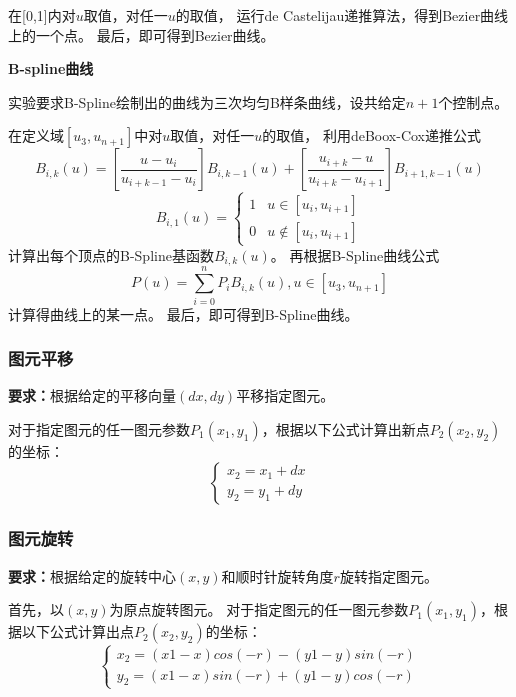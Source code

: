 \documentclass[a4paper,UTF8]{article}
\begin{document}
在[0,1]内对$u$取值，对任一$u$的取值，
运行de Castelijau递推算法，得到Bezier曲线上的一个点。
最后，即可得到Bezier曲线。

\textbf{B-spline曲线}

实验要求B-Spline绘制出的曲线为三次均匀B样条曲线，设共给定$n+1$个控制点。

在定义域$[u_3,u_{n+1}]$中对$u$取值，对任一$u$的取值，
利用deBoox-Cox递推公式
\begin{equation*}
    B_{i,k}(u)
    =[\frac{u-u_i}{u_{i+k-1}-u_i}]B_{i,k-1}(u)
    +[\frac{u_{i+k}-u}{u_{i+k}-u_{i+1}}]B_{i+1,k-1}(u)
\end{equation*}
\begin{equation*}
    B_{i,1}(u)=
    \begin{cases}
    1 & u\in[u_i,u_{i+1}]\\
    0 & u\not\in[u_i,u_{i+1}]
    \end{cases}
\end{equation*}
计算出每个顶点的B-Spline基函数$B_{i,k}(u)$。
再根据B-Spline曲线公式
\begin{equation*}
    P(u)=\sum_{i=0}^nP_iB_{i,k}(u),u\in[u_3,u_{n+1}]
\end{equation*}
计算得曲线上的某一点。
最后，即可得到B-Spline曲线。


\subsubsection{图元平移}
\textbf{要求：}根据给定的平移向量$(dx,dy)$平移指定图元。

对于指定图元的任一图元参数$P_1(x_1,y_1)$，根据以下公式计算出新点$P_2(x_2,y_2)$的坐标：
\begin{equation*}
    \begin{cases}
        x_2=x_1+dx\\
        y_2=y_1+dy
    \end{cases}
\end{equation*}


\subsubsection{图元旋转}
\textbf{要求：}根据给定的旋转中心$(x,y)$和顺时针旋转角度$r$旋转指定图元。

首先，以$(x,y)$为原点旋转图元。
对于指定图元的任一图元参数$P_1(x_1,y_1)$，根据以下公式计算出点$P_2(x_2,y_2)$的坐标：
\begin{equation*}
    \begin{cases}
        x_2=(x1-x)cos(-r)-(y1-y)sin(-r)\\
        y_2=(x1-x)sin(-r)+(y1-y)cos(-r)
    \end{cases}
\end{equation*}
\end{document}
